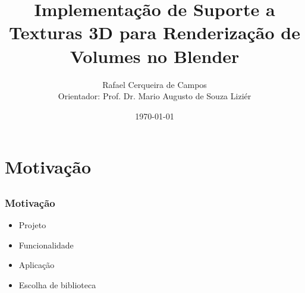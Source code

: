 \documentclass{beamer}
\title[Defesa]{Implementação de Suporte a Texturas 3D para Renderização de
Volumes no Blender}
\author[Rafael Campos]{Rafael Cerqueira de Campos \\ Orientador: Prof. Dr. Mario Augusto de Souza Liziér}
\institute[DC - UFSCAR]{Graduação em Engenharia de Computação - UFSCar}
\date{\today}
\begin{document}
\frame{\titlepage}

\AtBeginSubsection[]

\begin{frame}[allowframebreaks]
\tableofcontents
\end{frame}

\section{Motivação}
\subsection{}

\begin{frame}

\frametitle{Motivação}
\begin{itemize}
\item Projeto
\item Funcionalidade
\item Aplicação
\item Escolha de biblioteca
\end{itemize}

\end{frame}

\end{document}

